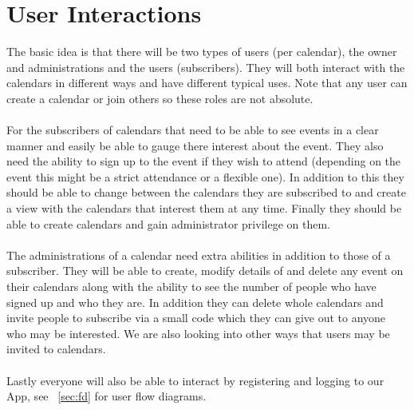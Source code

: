 \documentclass[11pt,a4paper]{article}
\begin{document}
\section{User Interactions} 
The basic idea is that there will be two types of users (per calendar), the owner and administrations and the users (subscribers). They will both interact with the calendars in different ways and have different typical uses. Note that any user can create a calendar or join others so these roles are not absolute. 
\\
\\
\noindent
For the subscribers of calendars that need to be able to see events in a clear manner and easily be able to gauge there interest about the event. They also need the ability to sign up to the event if they wish to attend (depending on the event this might be a strict attendance or a flexible one). In addition to this they should be able to change between the calendars they are subscribed to and create a view with the calendars that interest them at any time. Finally they should be able to create calendars and gain administrator privilege on them. 
\\
\\
\noindent
The administrations of a calendar need extra abilities in addition to those of a subscriber. They will be able to create, modify details of and delete any event on their calendars along with the ability to see the number of people who have signed up and who they are. In addition they can delete whole calendars and invite people to subscribe via a small code which they can give out to anyone who may be interested. We are also looking into other ways that users may be invited to calendars.  
\\
\\
\noindent
Lastly everyone will also be able to interact by registering and logging to our App, see ~\cref{sec:fd} for user flow diagrams.    

\appendix
\label{appendix}
\end{document}
